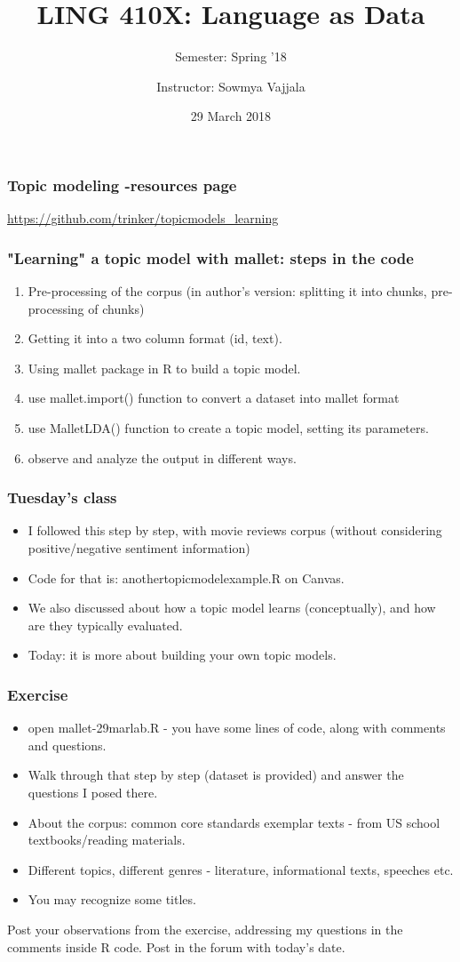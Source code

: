 \documentclass{beamer}
\author[Sowmya Vajjala]{Instructor: Sowmya Vajjala}
\title[LING 410X]{LING 410X: Language as Data}
\subtitle{Semester: Spring '18}
\date{29 March 2018}
\institute{Iowa State University, USA}
\begin{document}
\begin{frame}\titlepage
\end{frame}

\begin{frame}
\frametitle{Topic modeling -resources page}
\url{https://github.com/trinker/topicmodels_learning}
\end{frame}

\begin{frame}
\frametitle{"Learning" a topic model with mallet: steps in the code}
\begin{enumerate}
\item Pre-processing of the corpus (in author's version: splitting it into chunks, pre-processing of chunks)
\item Getting it into a two column format (id, text).
\item Using mallet package in R to build a topic model.
\item use mallet.import() function to convert a dataset into mallet format
\item use MalletLDA() function to create a topic model, setting its parameters. 
\item observe and analyze the output in different ways. 
\end{enumerate}
\end{frame}

\begin{frame}
\frametitle{Tuesday's class}
\begin{itemize}
\item I followed this step by step, with movie reviews corpus (without considering positive/negative sentiment information)
\item Code for that is: anothertopicmodelexample.R on Canvas.
\item We also discussed about how a topic model learns (conceptually), and how are they typically evaluated.
\item Today: it is more about building your own topic models.
\end{itemize}
\end{frame}

\begin{frame}
\frametitle{Exercise}
\begin{itemize}
\item open mallet-29marlab.R - you have some lines of code, along with comments and questions.
\item Walk through that step by step (dataset is provided) and answer the questions I posed there.
\item About the corpus: common core standards exemplar texts - from US school textbooks/reading materials. 
\item Different topics, different genres - literature, informational texts, speeches etc. 
\item You may recognize some titles.
\end{itemize}

Post your observations from the exercise, addressing my questions in the comments inside R code. Post in the forum with today's date. 
\end{frame}
\end{document}
